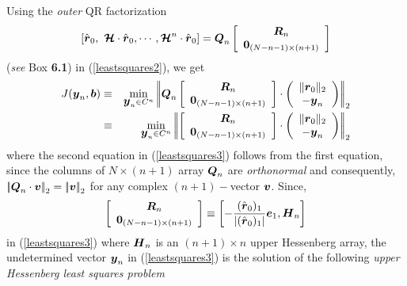 Using the {\em outer \/} QR factorization 
\[
\left[{ \hat{\mbox{\boldmath$\mit r$\unboldmath}}{}_{0},\ {\mbox{\boldmath$\cal H$\unboldmath}} \cdot \hat{\mbox{\boldmath$\mit r$\unboldmath}}{}_{ 0} ,\cdots 
,{\mbox{\boldmath$\cal H$\unboldmath}}^{n} \cdot \hat{\mbox{\boldmath$\mit r$\unboldmath}}{}_{ 0}}\right] = {\mbox{\boldmath$\mit Q$\unboldmath}}_{n}\left[ 
\begin{array}{c} {\mbox{\boldmath$\mit R$\unboldmath}}_{n} \\ {\bf 0}_{(N-n-1) \times 
(n+1)}\end{array}  \right]
\]
 ({\em see} {\sc Box} {\bf 6.1})  in
(\ref{leastsquares2}), we get 
\begin{eqnarray} \label{leastsquares3}
J({\mbox{\boldmath$\mit y$\unboldmath}}_{n},{\mbox{\boldmath$\mit b$\unboldmath}}) &\equiv&  \min_{{\mbox{\boldmath$\mit y$\unboldmath}}_{n}\in C^{n}} 
\left|\!\left|
{\mbox{\boldmath$\mit Q$\unboldmath}}_{n}\left[ \begin{array}{c} {\mbox{\boldmath$\mit R$\unboldmath}}_{n} \\ {\bf 0}_{(N-n-1) 
\times 
(n+1)}\end{array}  \right]\cdot\left(\begin{array}{c}
\| {\mbox{\boldmath$\mit r$\unboldmath}}{}_{0} \|_{2}\\
-{\mbox{\boldmath$\mit y$\unboldmath}}_{n}
\end{array} \right)
\right|\!\right|_{2}\nonumber\\
&\equiv & \min_{{\mbox{\boldmath$\mit y$\unboldmath}}_{n}\in C^{n}} 
\left|\!\left|
\left[ \begin{array}{c} {\mbox{\boldmath$\mit R$\unboldmath}}_{n} \\ {\bf 0}_{(N-n-1) \times 
(n+1)}\end{array}  \right]\cdot\left(\begin{array}{c}
\| {\mbox{\boldmath$\mit r$\unboldmath}}{}_{0} \|_{2}\\
-{\mbox{\boldmath$\mit y$\unboldmath}}_{n}
\end{array} \right)
\right|\!\right|_{2}
\end{eqnarray}
where the second equation in (\ref{leastsquares3}) follows from the first 
equation, 
since the columns of  $N \times (n+1)$ array ${\mbox{\boldmath$\mit Q$\unboldmath}}_{n}$ are {\em 
orthonormal\/} and consequently,  
$\left|\!\left|{\mbox{\boldmath$\mit Q$\unboldmath}}_{n}\cdot {\mbox{\boldmath$\mit v$\unboldmath}}\right|\!\right|_{2}= \left|\!\left|{\mbox{\boldmath$\mit v$\unboldmath}}\right|\!\right|_{2}$ for 
any 
complex $(n+1)-$vector ${\mbox{\boldmath$\mit v$\unboldmath}}$. Since, 
\[
\left[ \begin{array}{c} {\mbox{\boldmath$\mit R$\unboldmath}}_{n} \\ {\bf 0}_{(N-n-1) \times 
(n+1)}\end{array}  \right]\equiv \left[-\frac{ 
(\hat{\mbox{\boldmath$\mit r$\unboldmath}}_{0})_1}{ |(\hat{\mbox{\boldmath$\mit r$\unboldmath}}_{0})_1|} {\mbox{\boldmath$\mit e$\unboldmath}}_{1}, {\mbox{\boldmath$\mit H$\unboldmath}}_{n}\right]
\]
in (\ref{leastsquares3}) where ${\mbox{\boldmath$\mit H$\unboldmath}}_{n}$ is an
$(n+1)\times n$ upper Hessenberg array, the undetermined
vector ${\mbox{\boldmath$\mit y$\unboldmath}}_{n}$ in (\ref{leastsquares3}) is the solution of the 
following {\em upper Hessenberg least squares problem}
